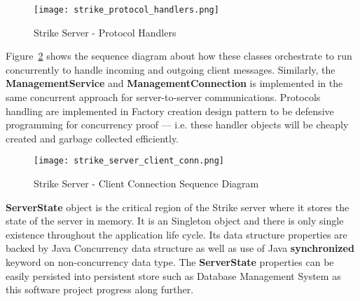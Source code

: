 \documentclass[dareport.tex]{subfiles}
\begin{document}
\begin{figure}[h]
\texttt{[image: strike\_protocol\_handlers.png]}
\centering
\caption{Strike Server - Protocol Handlers}
\label{fig:protohdl}
\centering
\end{figure}

Figure~\ref{fig:clientsq} shows the sequence diagram about how these classes orchestrate to run concurrently to handle incoming and outgoing client messages. Similarly, the \textbf{ManagementService} and \textbf{ManagementConnection} is implemented in the same concurrent approach for server-to-server communications. Protocols handling are implemented in Factory creation design pattern to be defensive programming for concurrency proof --- i.e. these handler objects will be cheaply created and garbage collected efficiently.

\begin{figure}[h]
\texttt{[image: strike\_server\_client\_conn.png]}
\caption{Strike Server - Client Connection Sequence Diagram}
\label{fig:clientsq}
\centering
\end{figure}

\textbf{ServerState} object is the critical region of the Strike server where it stores the state of the server in memory. It is an Singleton object and there is only single existence throughout the application life cycle. Its data structure properties are backed by Java Concurrency data structure as well as use of Java \textbf{synchronized} keyword on non-concurrency data type. The \textbf{ServerState} properties can be easily persisted into persistent store such as Database Management System as this software project progress along further.
\end{document}
